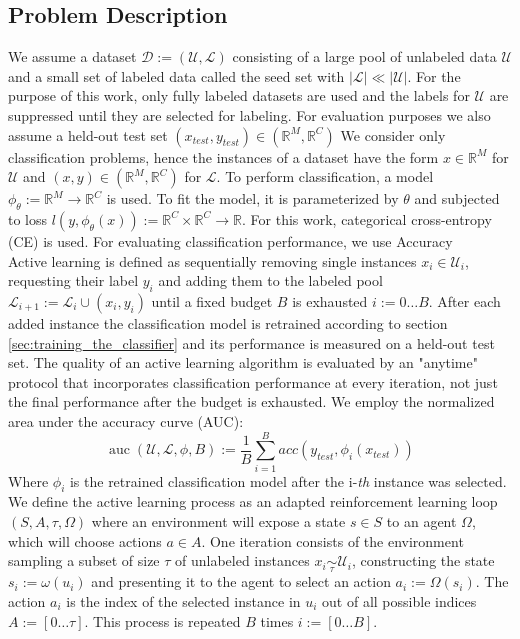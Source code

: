 \documentclass[]{article}
\begin{document}
\subsection{Problem Description}
We assume a dataset $\mathcal{D} := (\mathcal{U}, \mathcal{L})$ consisting of a large pool of unlabeled data $\mathcal{U}$ and a small set of labeled data called the seed set with $|\mathcal{L}| \ll |\mathcal{U|}$. 
For the purpose of this work, only fully labeled datasets are used and the labels for $\mathcal{U}$ are suppressed until they are selected for labeling.
For evaluation purposes we also assume a held-out test set $(x_{test}, y_{test}) \in (\mathbb{R}^M, \mathbb{R}^C)$
We consider only classification problems, hence the instances of a dataset have the form $x \in \mathbb{R}^M$ for $\mathcal{U}$ and $(x, y) \in (\mathbb{R}^M, \mathbb{R}^C)$ for $\mathcal{L}$.
To perform classification, a model $\phi_\theta := \mathbb{R}^M \rightarrow \mathbb{R}^C$ is used. To fit the model, it is parameterized by $\theta$ and subjected to loss $l(y, \phi_\theta(x)) := \mathbb{R}^C \times \mathbb{R}^C \rightarrow \mathbb{R}$. For this work, categorical cross-entropy (CE) is used.
For evaluating classification performance, we use Accuracy \\ [1mm]
Active learning is defined as sequentially removing single instances $x_i \in \mathcal{U}_i$, requesting their label $y_i$ and adding them to the labeled pool $\mathcal{L}_{i+1} := \mathcal{L}_i \cup (x_i, y_i)$ until a fixed budget $B$ is exhausted $i := 0 \ldots B$.
After each added instance the classification model is retrained according to section \ref{sec:training_the_classifier} and its performance is measured on a held-out test set.
The quality of an active learning algorithm is evaluated by an "anytime" protocol that incorporates classification performance at every iteration, not just the final performance after the budget is exhausted.
We employ the normalized area under the accuracy curve (AUC):
\begin{equation}
	\operatorname{auc}(\mathcal{U}, \mathcal{L}, \phi, B) := \frac{1}{B} \sum_{i=1}^{B} acc(y_{test}, \phi_i(x_{test}))
\end{equation}
Where $\phi_i$ is the retrained classification model after the i-\textit{th} instance was selected. \\ [1mm]
We define the active learning process as an adapted reinforcement learning loop $(S, A, \tau, \Omega)$ where an environment will expose a state $s \in S$ to an agent $\Omega$, which will choose actions $a \in A$.
One iteration consists of the environment sampling a subset of size $\tau$ of unlabeled instances $x_i \underset{\tau}{\sim} \mathcal{U}_i$, constructing the state $s_i := \omega(u_i)$ and presenting it to the agent to select an action $a_i := \Omega(s_i)$.
The action $a_i$ is the index of the selected instance in $u_i$ out of all possible indices $A := [0 \ldots \tau]$.
This process is repeated $B$ times $i := [0 \ldots B]$.
\end{document}
